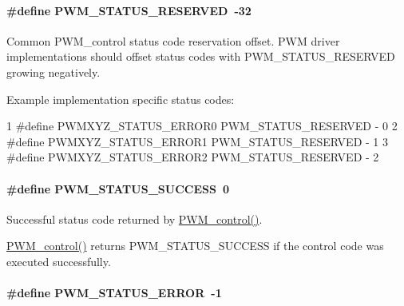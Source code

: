 \paragraph[{P\+W\+M\+\_\+\+S\+T\+A\+T\+U\+S\+\_\+\+R\+E\+S\+E\+R\+V\+E\+D}]{\setlength{\rightskip}{0pt plus 5cm}\#define P\+W\+M\+\_\+\+S\+T\+A\+T\+U\+S\+\_\+\+R\+E\+S\+E\+R\+V\+E\+D~-\/32}\label{_p_w_m_8h_a88616e9288d6e3a4dbab321af26cc04a}
Common P\+W\+M\+\_\+control status code reservation offset. P\+W\+M driver implementations should offset status codes with P\+W\+M\+\_\+\+S\+T\+A\+T\+U\+S\+\_\+\+R\+E\+S\+E\+R\+V\+E\+D growing negatively.

Example implementation specific status codes\+: 
\begin{DoxyCode}
1 #define PWMXYZ\_STATUS\_ERROR0    PWM\_STATUS\_RESERVED - 0
2 #define PWMXYZ\_STATUS\_ERROR1    PWM\_STATUS\_RESERVED - 1
3 #define PWMXYZ\_STATUS\_ERROR2    PWM\_STATUS\_RESERVED - 2
\end{DoxyCode}
\paragraph[{P\+W\+M\+\_\+\+S\+T\+A\+T\+U\+S\+\_\+\+S\+U\+C\+C\+E\+S\+S}]{\setlength{\rightskip}{0pt plus 5cm}\#define P\+W\+M\+\_\+\+S\+T\+A\+T\+U\+S\+\_\+\+S\+U\+C\+C\+E\+S\+S~0}\label{_p_w_m_8h_a9b234f3cd0bdffc3da5b56a6c4db9563}


Successful status code returned by \hyperlink{_p_w_m_8h_ade999f5b12997479efa1ac85aaf46ef5}{P\+W\+M\+\_\+control()}. 

\hyperlink{_p_w_m_8h_ade999f5b12997479efa1ac85aaf46ef5}{P\+W\+M\+\_\+control()} returns P\+W\+M\+\_\+\+S\+T\+A\+T\+U\+S\+\_\+\+S\+U\+C\+C\+E\+S\+S if the control code was executed successfully. 
\paragraph[{P\+W\+M\+\_\+\+S\+T\+A\+T\+U\+S\+\_\+\+E\+R\+R\+O\+R}]{\setlength{\rightskip}{0pt plus 5cm}\#define P\+W\+M\+\_\+\+S\+T\+A\+T\+U\+S\+\_\+\+E\+R\+R\+O\+R~-\/1}\label{_p_w_m_8h_a739297dfb10ab4363e7b5db30fdd1ce0}


